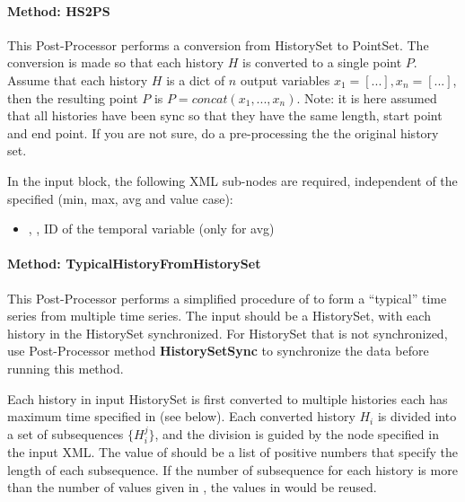 \paragraph{Method: HS2PS}

This Post-Processor performs a conversion from HistorySet to PointSet.
The conversion is made so that each history $H$ is converted to a single point $P$.
Assume that each history $H$ is a dict of $n$ output variables $x_1=[...],x_n=[...]$, then the resulting point $P$ is $P=concat(x_1,...,x_n)$.
Note: it is here assumed that all histories have been sync so that they have the same length, start point and end point. If you are not sure, do a pre-processing the the original history set.

In the  input block, the following XML sub-nodes are required,
independent of the  specified (min, max, avg and value case):

\begin{itemize}
   \item {}, , ID of the temporal variable (only for avg)
\end{itemize}

\paragraph{Method: TypicalHistoryFromHistorySet}
This Post-Processor performs a simplified procedure of \cite{wilcox2008users} to form a ``typical'' time series from multiple time series. The input should be a HistorySet, with each history in the HistorySet synchronized. For HistorySet that is not synchronized, use Post-Processor method \textbf{HistorySetSync}  to synchronize the data before running this method.

Each history in input HistorySet is first converted to multiple histories each has maximum time specified in  (see below). Each converted history $H_i$ is divided into a set of subsequences $\{H_i^j\}$, and the division is guided by the  node specified in the input XML. The value of  should be a list of positive numbers that specify the length of each subsequence. If the number of subsequence for each history is more than the number of values given in , the values in  would be reused.

